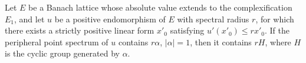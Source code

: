 Let $E$ be a Banach lattice whose absolute value extends to the complexification $E_1$, and let $u$ be a positive endomorphism of $E$ with spectral radius $r$, for which there exists a strictly positive linear form $x'_0$ satisfying $u'(x'_0) \leq r x'_0$. If the peripheral point spectrum of $u$ contains $r\alpha$, $|\alpha| = 1$, then it contains $rH$, where $H$ is the cyclic group generated by $\alpha$.
